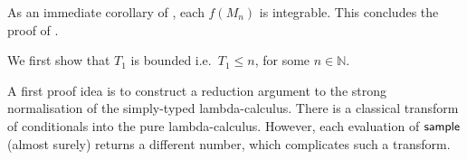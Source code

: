 As an immediate corollary of , each $f(M_n)$ is integrable.
This concludes the proof of . 

\medskip

\newcommand\transform[1]{{\ulcorner{#1}\urcorner}}

\iffalse
As before, fix a $M \in \Lambda^0$.
Recall the random variables on $(S, \calF, \mu)$:
\begin{align*}
T_0(s) & := 0 \\
T_{n+1}(s) & := \min \{ k \mid k>T_n(s), M_k(s) \textrm{ a value or of form } E[\tY \lambda x. N] \}
\end{align*}
\fi

\TnBounded*

We first show that $T_1$ is bounded i.e.~$T_1 \leq n$, for some $n \in \mathbb N$.

A first proof idea is to construct a reduction argument to the strong normalisation of the simply-typed lambda-calculus.
 There is a classical transform of conditionals into the pure lambda-calculus.
However, each evaluation of $\mathsf{sample}$ (almost surely) returns a different number, which complicates such a transform.

